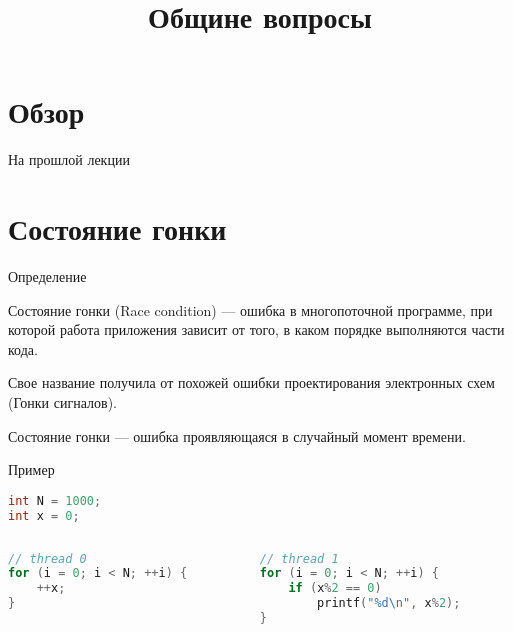 

\title{Общине вопросы}



\begin{frame}
\titlepage
\end{frame}

\section{Обзор}

\begin{frame}
\tableofcontents
\end{frame} 

\begin{frame}{На прошлой лекции}
\end{frame}


\section{Состояние гонки}

\begin{frame}{Определение}

Состояние гонки (\abbr Race condition) --- ошибка в многопоточной программе, при которой работа приложения зависит от того, в каком порядке выполняются части кода.

Свое название получила от похожей ошибки проектирования электронных схем (Гонки сигналов).

Состояние гонки --- ошибка проявляющаяся в случайный момент времени.

\end{frame}

\begin{frame}[fragile]{Пример}

\begin{lstlisting}[language=C++,basicstyle=\ttfamily,keywordstyle=\color{blue},basicstyle=\scriptsize]
int N = 1000;
int x = 0;
\end{lstlisting}

\begin{columns}[t]
    \begin{column}[T]{0.45\textwidth}
    \begin{lstlisting}[language=C++,basicstyle=\ttfamily,keywordstyle=\color{blue},basicstyle=\scriptsize]
// thread 0
for (i = 0; i < N; ++i) {
    ++x;
}
    \end{lstlisting}
    \end{column}
    \begin{column}[T]{0.45\textwidth}
    \begin{lstlisting}[language=C++,basicstyle=\ttfamily,keywordstyle=\color{blue},basicstyle=\scriptsize]
// thread 1
for (i = 0; i < N; ++i) {
    if (x%2 == 0)
        printf("%d\n", x%2);
}
    \end{lstlisting}
    \end{column}
\end{columns}

\end{frame}

